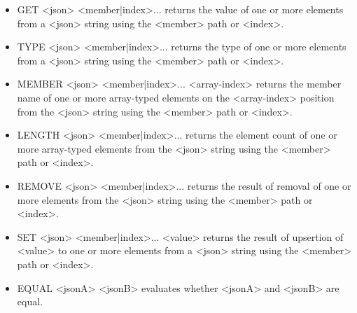 \begin{itemize}
\item 
GET <json> <member|index>... returns the value of one or more elements from a <json> string using the <member> path or <index>.

\item 
TYPE <json> <member|index>... returns the type of one or more elements from a <json> string using the <member> path or <index>.

\item 
MEMBER <json> <member|index>... <array-index> returns the member name of one or more array-typed elements on the <array-index> position from the <json> string using the <member> path or <index>.

\item 
LENGTH <json> <member|index>... returns the element count of one or more array-typed elements from the <json> string using the <member> path or <index>.

\item
REMOVE <json> <member|index>... returns the result of removal of one or more elements from the <json> string using the <member> path or <index>.

\item
SET <json> <member|index>... <value> returns the result of upsertion of <value> to one or more elements from a <json> string using the <member> path or <index>.

\item
EQUAL <jsonA> <jsonB> evaluates whether <jsonA> and <jsonB> are equal.
\end{itemize}





















